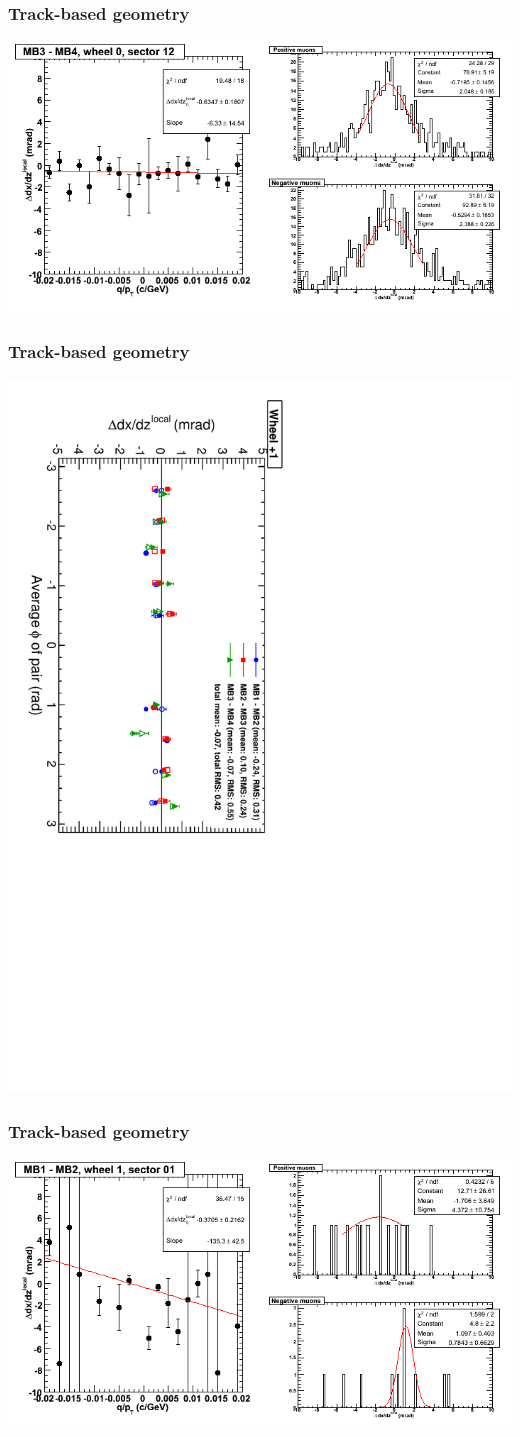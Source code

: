 \documentclass[compress]{beamer}
\begin{document}
\begin{frame}
\frametitle{Track-based geometry}
\includegraphics[width=\linewidth]{NOV4_segdiffs/dt13_slope_C_12_34.png}
\end{frame}

\begin{frame}
\frametitle{Track-based geometry}
\includegraphics[height=\linewidth, angle=90]{NOV4_segdiff_dxdz_whp1.pdf}
\end{frame}

\begin{frame}
\frametitle{Track-based geometry}
\includegraphics[width=\linewidth]{NOV4_segdiffs/dt13_slope_D_01_12.png}
\end{frame}
\end{document}
